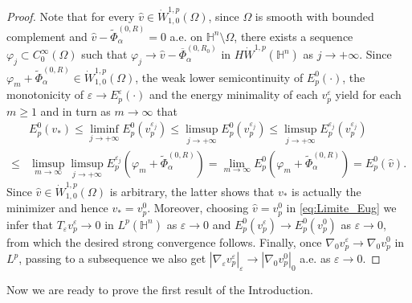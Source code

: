 \documentclass[10pt]{amsart}
\numberwithin{equation}{section}
\theoremstyle{definition}
\newcommand{\He}{\mathbb{H}}
\begin{document}
\begin{proof}
 Note that for every $\hat{v}\in \dot{W}^{1,p}_{1,0}(\Omega)$, since $\Omega$ is smooth with bounded complement and $\hat{v}- \tilde{\Phi}^{(0,R)}_{\alpha} =0$ a.e. on $\He^n \setminus \Omega$, there exists a sequence $\varphi_{j} \subset C^{\infty}_{0}(\Omega)$ such that $\varphi_{j} \to \hat{v} - \overline{\Phi}^{(0,R_0)}_{\alpha}$ in $H\dot{W}^{1,p}(\He^n)$ as $j \to +\infty$. Since $ \varphi_{m}+\tilde{\Phi}^{(0,R)}_{\alpha}  \in \dot{W}^{1,p}_{1,0}(\Omega) $, the weak lower semicontinuity of $E^{0}_{p}(\cdot )$, the monotonicity of $ \varepsilon \to E^\varepsilon_p(\cdot)$ and the energy minimality of each $v_p^\varepsilon$ yield for each $m \geq 1$ and in turn as $m \to \infty$ that 
\begin{equation}\label{eq:Limite_Eug}
\begin{aligned}
&E^{0}_{p}(v_*)  \leq \liminf_{j\to +\infty} E_p^{0} (v_p^{\varepsilon_j}) \leq \limsup_{j\to +\infty} E_p^{0}(v_p^{\varepsilon_j}) \leq \limsup_{j\to +\infty} E_p^{\varepsilon_j}(v_p^{\varepsilon_j})\\
\leq & \limsup_{m \to \infty} \limsup_{j\to +\infty} E_p^{\varepsilon_j}\left(\varphi_{m}+\tilde{\Phi}^{(0,R)}_{\alpha}\right) = \lim_{m \to \infty} E_p^0 \left( \varphi_{m}+\tilde{\Phi}^{(0,R)}_{\alpha}\right) =  E^{0}_{p}(\hat{v}).
\end{aligned}
\end{equation}
Since $\hat{v}\in \dot{W}_{1,0}^{1,p}(\Omega)$ is arbitrary, the latter shows that $v_*$ is actually the minimizer and hence $v_*=v_p^0$. Moreover, choosing $\hat{v}=v^{0}_{p}$ in \eqref{eq:Limite_Eug} we infer that $T_\varepsilon v_p^\varepsilon \to 0$ in $L^p(\He^n)$ as $\varepsilon \to 0$ and $E^0_p(v_p^{\varepsilon}) \to E^0_p(v^0_p)$ as $\varepsilon \to 0$, from which the desired strong convergence follows. Finally, once $\nabla_0 v^\varepsilon_p \to \nabla_0 v^0_p$ in $L^p$, passing to a subsequence we also get $|\nabla_\varepsilon v^\varepsilon_p|_\varepsilon \to |\nabla_0 v^0_p|_0$ a.e. as $\varepsilon \to 0$. 
\end{proof}


Now we are ready to prove the first result of the Introduction.
\end{document}
